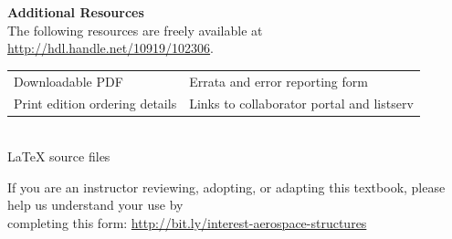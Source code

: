 \documentclass{AeroStructure-ERJohnson}
\begin{document}
\thispagestyle{empty}

\clearpage

\null\vspace{-2.5\baselineskip}\vspace{-50pt}%


\vspace{6pt}

{\parindent=0pt\setlength\parskip{9pt}

{\small
\textbf{Additional Resources}\\
The following resources are freely available at
\url{http://hdl.handle.net/10919/102306}.\\
\begin{tabular}[t]{@{}l@{\hskip46pt}l@{}}
Downloadable PDF & Errata and error reporting form\\
Print edition ordering details& Links to collaborator portal and listserv
\end{tabular}\\
LaTeX source files\par}

If you are an instructor reviewing, adopting, or adapting this
textbook, please help us understand your use by\\
completing this form:
\url{http://bit.ly/interest-aerospace-structures}

\vspace{6pt}

{\setlength{\columnsep}{9pt}

}}
\end{document}
